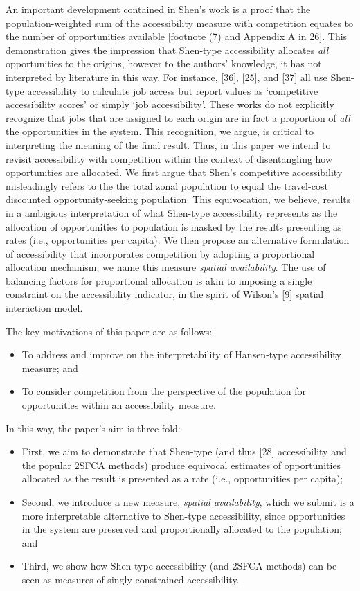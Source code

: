 \documentclass[10pt,letterpaper]{article}
\begin{document}
An important development contained in Shen's work is a proof that the
population-weighted sum of the accessibility measure with competition
equates to the number of opportunities available {[}footnote (7) and
Appendix A in 26{]}. This demonstration gives the impression that
Shen-type accessibility allocates \emph{all} opportunities to the
origins, however to the authors' knowledge, it has not interpreted by
literature in this way. For instance, {[}36{]}, {[}25{]}, and {[}37{]}
all use Shen-type accessibility to calculate job access but report
values as `competitive accessibility scores' or simply `job
accessibility'. These works do not explicitly recognize that jobs that
are assigned to each origin are in fact a proportion of \emph{all} the
opportunities in the system. This recognition, we argue, is critical to
interpreting the meaning of the final result. Thus, in this paper we
intend to revisit accessibility with competition within the context of
disentangling how opportunities are allocated. We first argue that
Shen's competitive accessibility misleadingly refers to the the total
zonal population to equal the travel-cost discounted opportunity-seeking
population. This equivocation, we believe, results in a ambigious
interpretation of what Shen-type accessibility represents as the
allocation of opportunities to population is masked by the results
presenting as rates (i.e., opportunities per capita). We then propose an
alternative formulation of accessibility that incorporates competition
by adopting a proportional allocation mechanism; we name this measure
\emph{spatial availability}. The use of balancing factors for
proportional allocation is akin to imposing a single constraint on the
accessibility indicator, in the spirit of Wilson's {[}9{]} spatial
interaction model.

The key motivations of this paper are as follows:

\begin{itemize}
\item
  To address and improve on the interpretability of Hansen-type
  accessibility measure; and
\item
  To consider competition from the perspective of the population for
  opportunities within an accessibility measure.
\end{itemize}

In this way, the paper's aim is three-fold:

\begin{itemize}
\item
  First, we aim to demonstrate that Shen-type (and thus {[}28{]}
  accessibility and the popular 2SFCA methods) produce equivocal
  estimates of opportunities allocated as the result is presented as a
  rate (i.e., opportunities per capita);
\item
  Second, we introduce a new measure, \emph{spatial availability}, which
  we submit is a more interpretable alternative to Shen-type
  accessibility, since opportunities in the system are preserved and
  proportionally allocated to the population; and
\item
  Third, we show how Shen-type accessibility (and 2SFCA methods) can be
  seen as measures of singly-constrained accessibility.
\end{itemize}
\end{document}
